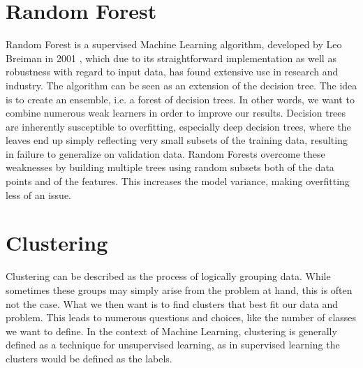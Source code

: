 \documentclass[]{report}
\begin{document}
\section{Random Forest}
Random Forest is a supervised Machine Learning algorithm, developed by Leo Breiman in 2001 \cite{breiman2001}, which due to its straightforward implementation as well as robustness with regard to input data, has found extensive use in research and industry. The algorithm can be seen as an extension of the decision tree. The idea is to create an ensemble, i.e. a forest of decision trees. In other words, we want to combine numerous weak learners in order to improve our results. Decision trees are inherently susceptible to overfitting, especially deep decision trees, where the leaves end up simply reflecting very small subsets of the training data, resulting in failure to generalize on validation data. Random Forests overcome these weaknesses by building multiple trees using random subsets both of the data points and of the features. This increases the model variance, making overfitting less of an issue. \\


\section{Clustering}

Clustering can be described as the process of logically grouping data. While sometimes these groups may simply arise from the problem at hand, this is often not the case. What we then want is to find clusters that best fit our data and problem. This leads to numerous questions and choices, like the number of classes we want to define. In the context of Machine Learning, clustering is generally defined as a technique for unsupervised learning, as in supervised learning the clusters would be defined as the labels.\\
\end{document}

